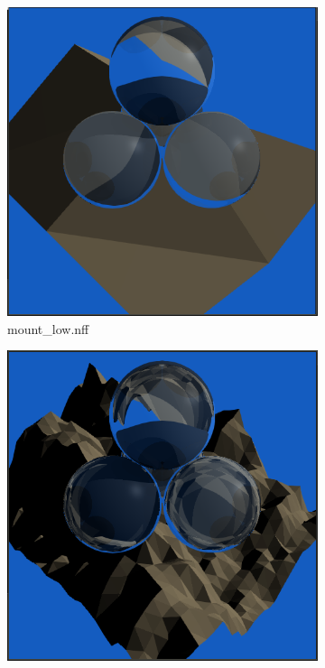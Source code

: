 \documentclass{article}
\begin{document}
    \begin{figure}[h!]
        \centering
        \begin{subfigure}[b]{.2\linewidth}
            \includegraphics[width=\linewidth]{mount_low.png}
            \caption{mount\_low.nff}
            \label{fig:mount_low}
        \end{subfigure}
        \begin{subfigure}[b]{.2\linewidth}
            \includegraphics[width=\linewidth]{mount_high.png}

\end{subfigure}
\end{figure}
\end{document}
